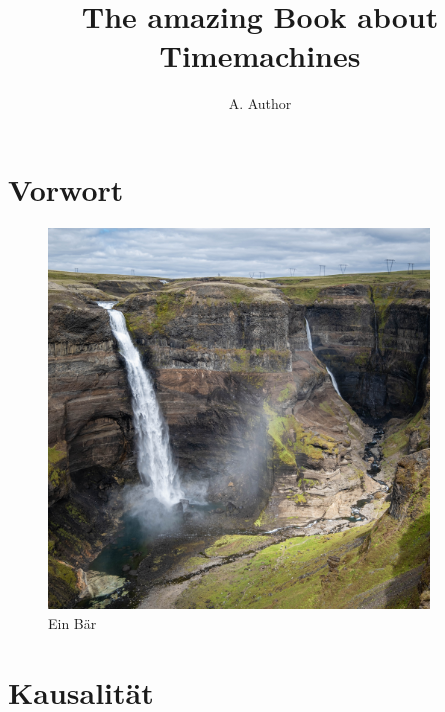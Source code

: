 \documentclass[
a5paper,
10pt, 
onecolumn,
openany,
]{memoir}
\author{\sffamily\huge A. Author}
\title{\sffamily\Huge The amazing Book about Timemachines}
\date{}
\begin{document}
\frontmatter

\maketitle

\clearpage

\tableofcontents*

\clearpage

\chapter{Vorwort}

\lipsum[1-2]

\begin{figure}
  \centering
  \includegraphics[width=0.9\textwidth]{fotos/a}
  \caption{Ein Bär}
\end{figure}

\lipsum[1-2]

\mainmatter





\clearpage

\thispagestyle{empty}
\listoffigures
\clearpage

\thispagestyle{empty}
\listoftables
\clearpage

\appendix

\chapter{Kausalität}

\lipsum[1-2]

\backmatter
\end{document}
